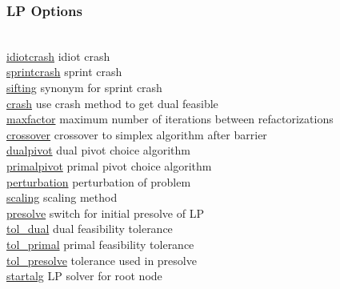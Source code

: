 \subsubsection{LP Options}
\begin{tabbing}
\hspace {1.3in} \= \\
\hyperlink{idiotcrash}
{idiotcrash} \> idiot crash \\
\hyperlink{sprintcrash}
{sprintcrash} \> sprint crash \\
\hyperlink{sifting}
{sifting} \> synonym for sprint crash \\
\hyperlink{crash}
{crash} \> use crash method to get dual feasible \\
\hyperlink{maxfactor}
{maxfactor} \> maximum number of iterations between refactorizations \\
\hyperlink{crossover}
{crossover} \> crossover to simplex algorithm after barrier \\
\hyperlink{dualpivot}
{dualpivot} \> dual pivot choice algorithm \\
\hyperlink{primalpivot}
{primalpivot} \> primal pivot choice algorithm \\
\hyperlink{perturbation}
{perturbation} \> perturbation of problem \\
\hyperlink{scaling}
{scaling} \> scaling method \\
\hyperlink{presolve}
{presolve} \> switch for initial presolve of LP \\
\hyperlink{tol_dual}
{tol\_dual} \> dual feasibility tolerance \\
\hyperlink{tol_primal}
{tol\_primal} \> primal feasibility tolerance \\
\hyperlink{tol_presolve}
{tol\_presolve} \> tolerance used in presolve \\
\hyperlink{startalg}
{startalg} \> LP solver for root node \\
\end{tabbing}


